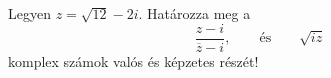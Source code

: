 \documentclass[11pt]{scrartcl}
\begin{document}
Legyen $z = \sqrt{12} - 2i$. Határozza meg a
\[
	\frac{z - i}{\overline{z} - i}, \qquad \text{és} \qquad \sqrt{iz}
\]
komplex számok valós és képzetes részét!
\end{document}
